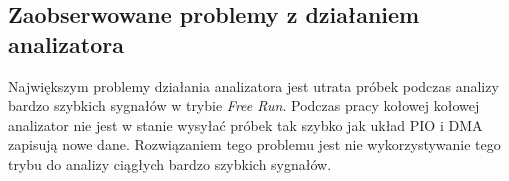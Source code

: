     \subsection{Zaobserwowane problemy z działaniem analizatora}
        Największym problemy działania analizatora jest utrata próbek podczas analizy bardzo szybkich sygnałów w trybie \textit{Free Run}.
        Podczas pracy kołowej kołowej analizator nie jest w stanie wysyłać próbek tak szybko jak układ PIO i DMA zapisują nowe dane.
        Rozwiązaniem tego problemu jest nie wykorzystywanie tego trybu do analizy ciągłych bardzo szybkich sygnałów.


    